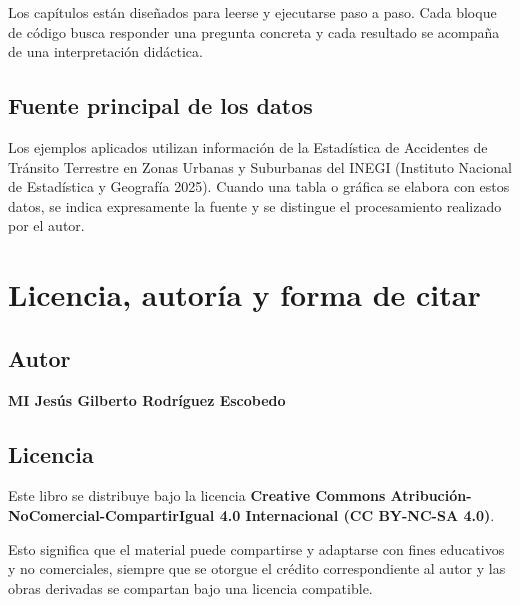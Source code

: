 \documentclass[
  spanish,
  10.5pt,
  letterpaper,
  openany,
  headings=big]{scrbook}
\begin{document}

Los capítulos están diseñados para leerse y ejecutarse paso a paso. Cada
bloque de código busca responder una pregunta concreta y cada resultado
se acompaña de una interpretación didáctica.

\section*{Fuente principal de los
datos}\label{fuente-principal-de-los-datos}


Los ejemplos aplicados utilizan información de la Estadística de
Accidentes de Tránsito Terrestre en Zonas Urbanas y Suburbanas del INEGI
(Instituto Nacional de Estadística y Geografía 2025). Cuando una tabla o
gráfica se elabora con estos datos, se indica expresamente la fuente y
se distingue el procesamiento realizado por el autor.


\chapter*{Licencia, autoría y forma de
citar}\label{licencia-autoruxeda-y-forma-de-citar}


\section*{Autor}\label{autor}


\textbf{MI Jesús Gilberto Rodríguez Escobedo}

\section*{Licencia}\label{licencia}


Este libro se distribuye bajo la licencia \textbf{Creative Commons
Atribución-NoComercial-CompartirIgual 4.0 Internacional (CC BY-NC-SA
4.0)}.

Esto significa que el material puede compartirse y adaptarse con fines
educativos y no comerciales, siempre que se otorgue el crédito
correspondiente al autor y las obras derivadas se compartan bajo una
licencia compatible.
\end{document}
